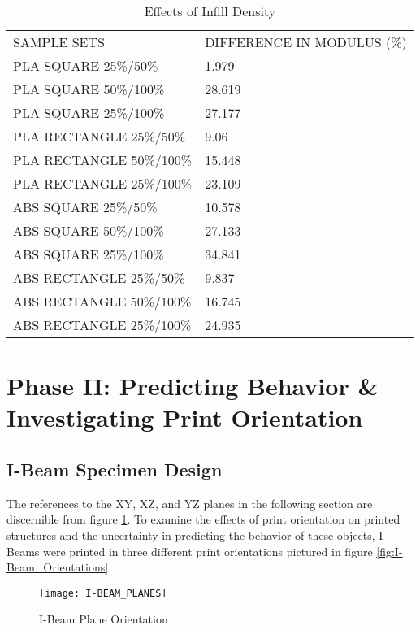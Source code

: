 	 	\begin{table} [h]
		\centering	
		\begin{tabularx}{\textwidth}{ X X }
		\noalign{\hrule height 2pt}
			\multicolumn{2}{c}{EFFECTS OF INFILL} \\ \hline
			SAMPLE SETS & DIFFERENCE IN MODULUS (\%) \\ \hline
			PLA SQUARE 25\%/50\% & 1.979 \\  
			PLA SQUARE 50\%/100\% & 28.619 \\
			PLA SQUARE 25\%/100\% & 27.177 \\ \hline
			PLA RECTANGLE 25\%/50\% & 9.06 \\ 
			PLA RECTANGLE 50\%/100\% & 15.448 \\ 
			PLA RECTANGLE 25\%/100\% & 23.109 \\ \hline
			ABS SQUARE 25\%/50\% & 10.578 \\  
			ABS SQUARE 50\%/100\% & 27.133 \\
			ABS SQUARE 25\%/100\% & 34.841 \\ \hline
			ABS RECTANGLE 25\%/50\% & 9.837 \\  
			ABS RECTANGLE 50\%/100\% & 16.745 \\
			ABS RECTANGLE 25\%/100\% & 24.935 \\ \hline
		\end{tabularx}
		\caption{Effects of Infill Density}
		\label{tab:Infill}
		\end{table}

\section{Phase II: Predicting Behavior \& Investigating Print Orientation}
\subsection{I-Beam Specimen Design}

The references to the XY, XZ, and YZ planes in the following section are discernible from figure \ref{fig:I-Beam_Planes}. To examine the effects of print orientation on printed structures and the uncertainty in predicting the behavior of these objects, I-Beams were printed in three different print orientations pictured in figure \ref{fig:I-Beam_Orientations}.

	\begin{figure} [H]
		\centering
		\caption{I-Beam Plane Orientation}
		\texttt{[image: I-BEAM\_PLANES]}
		\label{fig:I-Beam_Planes}
	\end{figure}
	
